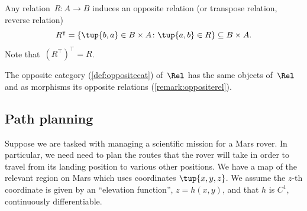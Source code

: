 \begin{remark}
\label{remark:oppositerel}
Any relation~$R\colon A\to B$ induces an opposite relation (or transpose relation, reverse relation) \begin{equation}
    R^\intercal =\{\tup{b,a}\in B\times A\colon \tup{a,b}\in R\} \subseteq B\times A.
\end{equation}
Note that~$\left( R^\intercal\right)^\intercal = R$.
\end{remark}

\begin{remark}
The opposite category (\cref{def:oppositecat}) of~$\Rel$ has the same objects of~$\Rel$ and as morphisms its opposite relations (\cref{remark:oppositerel}). 
\end{remark}

 
\subsection{Path planning}
\label{sec:trekking}

Suppose we are tasked with managing a scientific mission for a Mars rover. In particular, we need need to plan the routes that the rover will take in order to travel from its landing position to various other positions. We have a map of the relevant region on Mars which uses coordinates $\tup{x, y, z}$. We assume the $z$-th coordinate is given by an ``elevation function'', $z = h(x,y)$, and that $h$ is $C^1$,  continuously differentiable. 




